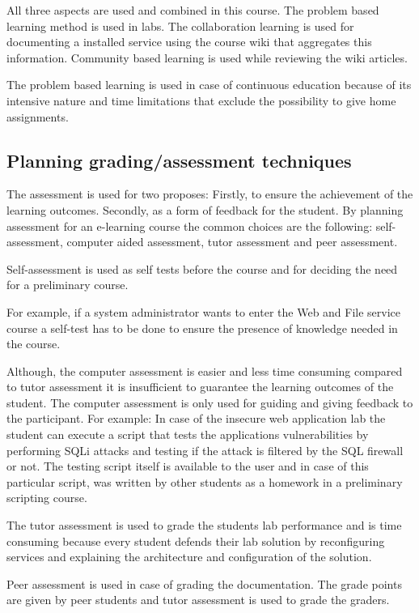 All three aspects are used and combined in this course. The problem based learning method is used in labs. The collaboration learning is used for documenting a installed service using the course wiki that aggregates this information. Community based learning is used while reviewing the wiki articles. 

The problem based learning is used in case of continuous education because of its intensive nature and time limitations that exclude the possibility to give home assignments.

\subsection{Planning grading/assessment techniques}
The assessment is used for two proposes: Firstly, to ensure the achievement of the learning outcomes. Secondly, as a form of feedback for the student. By planning assessment for an e-learning course the common choices are the following: self-assessment, computer aided assessment, tutor assessment and peer assessment. ~\citep{OppeArenduskeskus2010}

Self-assessment is used as self tests before the course and for  deciding the need for a preliminary course.

For example, if a system administrator wants to enter the Web and File service course a self-test has to be done to ensure the presence of knowledge needed in the course.

Although, the computer assessment is easier and less time consuming compared to tutor assessment it is insufficient to guarantee the learning outcomes of the student. The computer assessment is only used for guiding and giving feedback to the participant. For example: In case of the insecure web application lab the student can execute a script that tests the applications vulnerabilities by performing \gls{SQLi} attacks and testing if the attack is filtered by the \gls{SQL} firewall or not. The testing script itself is available to the user and in case of this particular script, was written by other students as a homework in a preliminary scripting course.


The tutor assessment is used to grade the students lab performance and is time consuming because every student defends their lab solution by reconfiguring services and explaining the architecture and configuration of the solution.

Peer assessment is used in case of grading the documentation. The grade points are given by peer students and tutor assessment is used to grade the graders.

